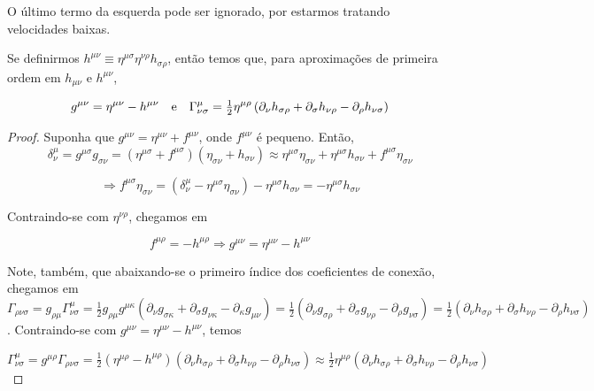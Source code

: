 O último termo da esquerda pode ser ignorado, por estarmos tratando velocidades baixas.

Se definirmos $ h^{\mu \nu} \equiv \eta^{\mu \sigma} \eta^{\nu \rho} h_{\sigma \rho} $, então temos que, para aproximações de primeira ordem em $ h_{\mu \nu} \text { e } h^{\mu \nu} $,

\begin{equation}\label{eq:HCovariante}
g^{\mu \nu}=\eta^{\mu \nu}-h^{\mu \nu} \qq{e} \Gamma_{\nu \sigma}^{\mu}=\tfrac{1}{2} \eta^{\mu \rho}\left(\partial_{\nu} h_{\sigma \rho}+\partial_{\sigma} h_{\nu \rho}-\partial_{\rho} h_{\nu \sigma}\right)
\end{equation}

\begin{proof}
	Suponha que $ g^{\mu \nu}=\eta^{\mu \nu}+f^{\mu \nu} $, onde $ f^{\mu\nu} $ é pequeno. Então,
	 \[\delta_{\nu}^{\mu}=g^{\mu \sigma} g_{\sigma \nu}=\left(\eta^{\mu \sigma}+f^{\mu \sigma}\right)\left(\eta_{\sigma \nu}+h_{\sigma \nu}\right) \approx
	 \eta^{\mu\sigma}\eta_{\sigma\nu}+\eta^{\mu\sigma}h_{\sigma\nu}+f^{\mu\sigma}\eta_{\sigma \nu} \]
	 
	 \[
	 \Rightarrow f^{\mu\sigma}\eta_{\sigma \nu}= (\delta_{\nu}^{\mu} - \eta^{\mu\sigma}\eta_{\sigma\nu})-\eta^{\mu\sigma}h_{\sigma\nu} = -\eta^{\mu\sigma}h_{\sigma\nu}
	 \]
	 
	 Contraindo-se com $ \eta^{\nu \rho} $, chegamos em 
	 
	 \[f^{\mu\rho}=-h^{\mu\rho} \Rightarrow g^{\mu \nu}=\eta^{\mu \nu}-h^{\mu \nu} \]
	 
	 Note, também, que abaixando-se o primeiro índice dos coeficientes de conexão, chegamos em $ \Gamma_{\rho \nu \sigma}=g_{\rho\mu}\Gamma_{\nu \sigma}^\mu=
	 \tfrac{1}{2}g_{\rho\mu}g^{\mu\kappa}(\partial_{\nu}g_{\sigma\kappa}+\partial_{\sigma}g_{\nu\kappa}-\partial_{\kappa}g_{\mu\nu})=
	 \tfrac{1}{2}\left(\partial_{\nu} g_{\sigma \rho}+\partial_{\sigma} g_{\nu \rho}-\partial_{\rho} g_{\nu \sigma}\right)=
	 \tfrac{1}{2}\left(\partial_{\nu} h_{\sigma \rho}+\partial_{\sigma} h_{\nu \rho}-\partial_{\rho} h_{\nu \sigma}\right)$. Contraindo-se com $  g^{\mu \nu}=\eta^{\mu \nu}-h^{\mu \nu} $, temos 
	 
	 \[
	 \Gamma^{\mu}_{\nu\sigma}=
	 g^{\mu\rho}\Gamma_{\rho\nu\sigma}= \tfrac{1}{2}(\eta^{\mu\rho}-h^{\mu\rho})(\partial_{\nu} h_{\sigma \rho}+\partial_{\sigma} h_{\nu \rho}-\partial_{\rho} h_{\nu \sigma})
	 \approx \tfrac{1}{2} \eta^{\mu \rho}\left(\partial_{\nu} h_{\sigma \rho}+\partial_{\sigma} h_{\nu \rho}-\partial_{\rho} h_{\nu \sigma}\right)
	 \]
	 
	 
\end{proof}


